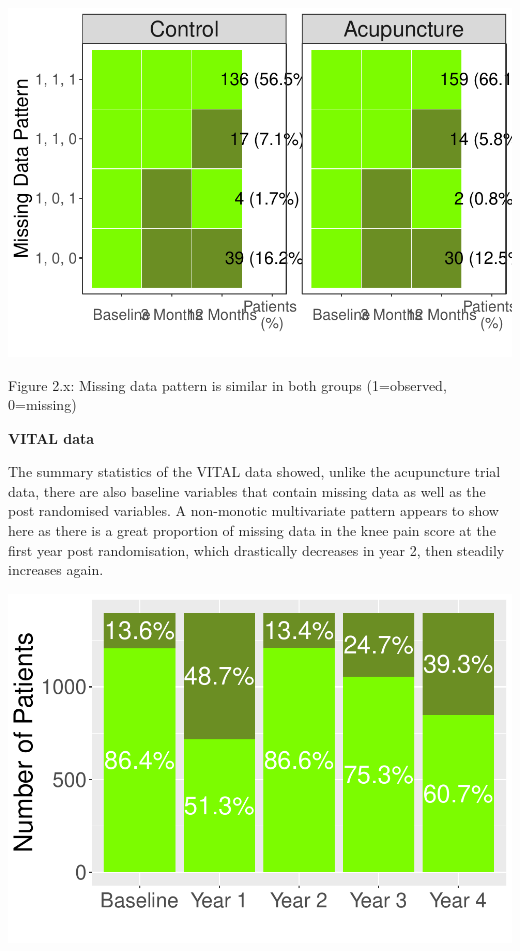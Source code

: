 \documentclass{article}
\newcommand{\pandocbounded}[1]{#1}
\begin{document}
\pandocbounded{\includegraphics[keepaspectratio]{Final_Report_files/figure-latex/unnamed-chunk-10-1.pdf}}

Figure 2.x: Missing data pattern is similar in both groups (1=observed,
0=missing)

\textbf{VITAL data}

The summary statistics of the VITAL data showed, unlike the acupuncture
trial data, there are also baseline variables that contain missing data
as well as the post randomised variables. A non-monotic multivariate
pattern appears to show here as there is a great proportion of missing
data in the knee pain score at the first year post randomisation, which
drastically decreases in year 2, then steadily increases again.

\pandocbounded{\includegraphics[keepaspectratio]{Final_Report_files/figure-latex/unnamed-chunk-11-1.pdf}}
\end{document}
